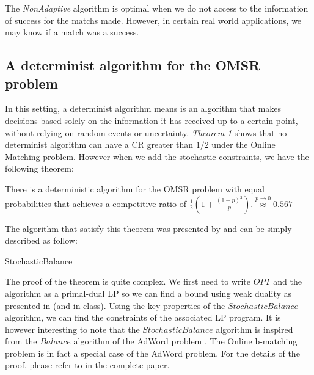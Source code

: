 \documentclass[12pt, twocolumn]{article}
\begin{document}
\par
\hspace{\parindent}The \textit{NonAdaptive} algorithm is optimal when we do not access to the information of success for the matchs made. However, in certain real world applications, we may know if a match was a success. 

\subsection{A determinist algorithm for the OMSR problem}

\par
\hspace{\parindent}In this setting, a determinist algorithm means is an algorithm that makes decisions based solely on the information it has received up to a certain point, without relying on random events or uncertainty. \textit{Theorem 1} shows that no determinist algorithm can have a CR greater than $1/2$ under the Online Matching problem. However when we add the stochastic constraints, we have the following theorem:

\begin{theorem}
    
There is a deterministic algorithm for the OMSR problem with equal probabilities that achieves a competitive ratio of \(  \frac{1}{2} \left( 1 + \frac{(1 - p)^2}{p} \right). \overset{p \to 0}{\approx}0.567\)
\end{theorem}

\par
\hspace{\parindent}The algorithm that satisfy this theorem was presented by \cite{mehta2012} and can be simply described as follow:

\begin{algorithm}[H]
\caption{StochasticBalance}
\label{alg:StochasticBalance}
\end{algorithm}

\par
\hspace{\parindent}The proof of the theorem is quite complex. We first need to write $OPT$ and the algorithm as a primal-dual LP so we can find a bound using weak duality as presented in \cite{jain2002} (and in class). Using the key properties of the $StochasticBalance$ algorithm, we can find the constraints of the associated LP program. It is however interesting to note that the $StochasticBalance$ algorithm is inspired from the $Balance$ algorithm of the AdWord problem \cite{jain2002}. The Online b-matching problem is in fact a special case of the AdWord problem. For the details of the proof, please refer to \cite{mehta2012} in the complete paper.
\end{document}
